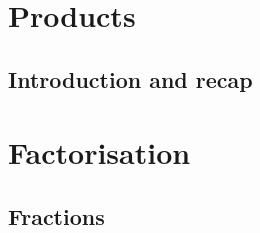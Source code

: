          \section{Products}
         \subsection{ Introduction and recap}
         \section{ Factorisation}
         \subsection{ Fractions}
